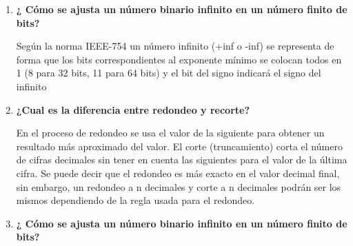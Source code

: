 \documentclass[12pt]{article}
\renewcommand{\_}{\kern-1.5pt\textunderscore\kern-1.5pt}
\begin{document}
\vspace{\baselineskip}
\setlength{\parskip}{8.04pt}
\setlength{\parskip}{0.0pt}
\begin{enumerate}
	\item {\fontsize{10pt}{12.0pt}\selectfont \textbf{¿ Cómo se ajusta un número binario inﬁnito en un número ﬁnito de bits?}\par}\par


\vspace{\baselineskip}
\setlength{\parskip}{8.04pt}
\setlength{\parskip}{0.0pt}
\begin{justify}
{\fontsize{10pt}{12.0pt}\selectfont Según la norma IEEE-754 un número infinito (+inf o -inf) se representa de forma que los bits correspondientes al exponente mínimo se colocan todos en 1 (8 para 32 bits, 11 para 64 bits) y el bit del signo indicará el signo del infinito\par}
\end{justify}\par


\vspace{\baselineskip}
\setlength{\parskip}{8.04pt}
\setlength{\parskip}{0.0pt}
	\item {\fontsize{10pt}{12.0pt}\selectfont \textbf{ ¿Cual es la diferencia entre redondeo y recorte?}\par}\par


\vspace{\baselineskip}
\setlength{\parskip}{8.04pt}
\setlength{\parskip}{0.0pt}
\begin{justify}
{\fontsize{10pt}{12.0pt}\selectfont En el proceso de redondeo se usa el valor de la siguiente para obtener un resultado más aproximado del valor. El corte (truncamiento) corta el número de cifras decimales sin tener en cuenta las siguientes para el valor de la última cifra. Se puede decir que el redondeo es más exacto en el valor decimal final, sin embargo, un redondeo a n decimales y corte a n decimales podrán ser los mismos dependiendo de la regla usada para el redondeo.\par}
\end{justify}\par


\vspace{\baselineskip}
\setlength{\parskip}{8.04pt}
\setlength{\parskip}{0.0pt}
	\item {\fontsize{10pt}{12.0pt}\selectfont \textbf{ ¿ Cómo se ajusta un número binario inﬁnito en un número ﬁnito de bits?}\par}\par



\end{enumerate}
\end{document}

